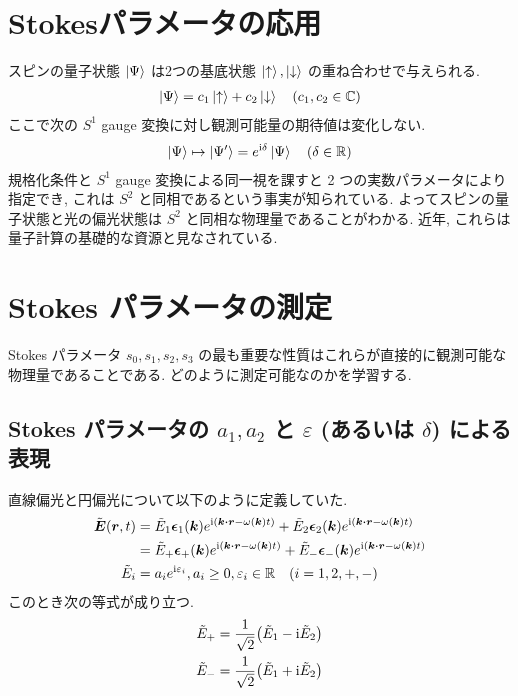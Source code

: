 \documentclass[a4paper,dvipdfmx]{jsarticle}
\theoremstyle{definition}
\begin{document}
\section{Stokesパラメータの応用}
スピンの量子状態 $\ket{\Psi}$ は2つの基底状態 $\ket{\uparrow}, \ket{\downarrow}$ の重ね合わせで与えられる.
\begin{align}
  \ket{\Psi} = c_1\ket{\uparrow} + c_2\ket{\downarrow} \quad (c_1, c_2 \in \mathbb{C})
\end{align}
ここで次の $S^1$ gauge 変換に対し観測可能量の期待値は変化しない.
\begin{align}
  \ket{\Psi} \mapsto \ket{\Psi'} = e^{\mathrm{i}\delta}\ket{\Psi} \quad (\delta\in\mathbb{R})
\end{align}
規格化条件と $S^1$ gauge 変換による同一視を課すと 2 つの実数パラメータにより指定でき, これは $S^2$ と同相であるという事実が知られている. よってスピンの量子状態と光の偏光状態は $S^2$ と同相な物理量であることがわかる. 近年, これらは量子計算の基礎的な資源と見なされている.

\section{Stokes パラメータの測定}
Stokes パラメータ $s_0, s_1, s_2, s_3$ の最も重要な性質はこれらが直接的に観測可能な物理量であることである. どのように測定可能なのかを学習する.
\subsection{Stokes パラメータの $a_1, a_2$ と $\varepsilon$ (あるいは $\delta$) による表現}
直線偏光と円偏光について以下のように定義していた.
\begin{align}
  \tilde{\EE}(\rr, t) & = \tilde{E}_1\ee_1(\kk)e^{\ii(\kk\vdot\rr - \omega(\kk)t)} + \tilde{E}_2\ee_2(\kk)e^{\ii(\kk\vdot\rr - \omega(\kk)t)} \label{ET line def}   \\
                      & = \tilde{E}_+\ee_+(\kk)e^{\ii(\kk\vdot\rr - \omega(\kk)t)} + \tilde{E}_-\ee_-(\kk)e^{\ii(\kk\vdot\rr - \omega(\kk)t)} \label{ET circle def} \\
  \tilde{E}_i         & = a_ie^{\ii\varepsilon_i}, a_i \geq 0, \varepsilon_i\in\RR \quad (i = 1, 2, +, -)
\end{align}
このとき次の等式が成り立つ.
\begin{align}
  \tilde{E}_+ & = \frac{1}{\sqrt{2}}\qty(\tilde{E}_1 - \mathrm{i}\tilde{E}_2) \\
  \tilde{E}_- & = \frac{1}{\sqrt{2}}\qty(\tilde{E}_1 + \mathrm{i}\tilde{E}_2)
\end{align}
\\
\end{document}
